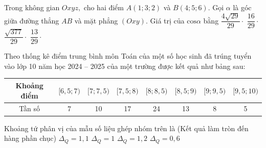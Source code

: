 \begin{ex}%
Trong không gian $Oxyz,$ cho hai điểm $A\left(1;3;2\right)$ và $B\left(4;5;6\right).$ Gọi $\alpha $ là góc giữa đường thẳng $AB$ và mặt phẳng $\left(Oxy\right).$ Giá trị của $\text{cos}\alpha $ bằng
\choice
{$\dfrac{4\sqrt{29}}{29}\cdot $}
{$\dfrac{16}{29}\cdot $}
{\True $\dfrac{\sqrt{377}}{29}\cdot $}
{$\dfrac{13}{29}\cdot $}
\end{ex}

\begin{ex}%
Theo thống kê điểm trung bình môn Toán của một số học sinh đã trúng tuyển vào lớp 10 năm học 2024 – 2025 của một trường được kết quả như bảng sau:
\begin{center}
\begin{tabular}{|c|c|c|c|c|c|c|c|}
    \hline
    Khoảng điểm & $[6,5; 7)$ & $[7; 7,5)$ & $[7,5; 8)$ & $[8; 8,5)$ & $[8,5; 9)$ & $[9; 9,5)$ & $[9,5; 10)$ \\
    \hline
    Tần số & 7 & 10 & 17 & 24 & 13 & 8 & 5 \\
    \hline
\end{tabular}
\end{center}

Khoảng tứ phân vị của mẫu số liệu ghép nhóm trên là (Kết quả làm tròn đến hàng phần chục)
\choice
{\True $\Delta_Q=1,1$}
{$\Delta_Q=1$}
{$\Delta_Q=1,2$}
{$\Delta_Q=0,6$}
\end{ex}

